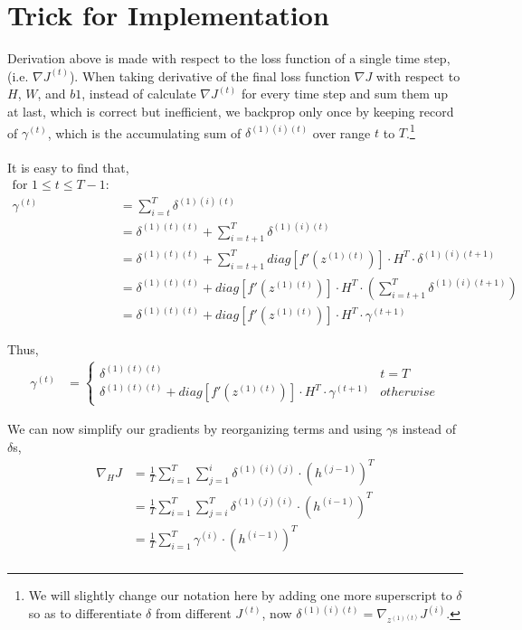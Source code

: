 \documentclass{article}
\begin{document}
	\section{Trick for Implementation}
	Derivation above is made with respect to the loss function of a single time step, (i.e. $\nabla J^{(t)}$). When taking derivative of the final loss function $\nabla J$ with respect to $H$, $W$, and $b1$, instead of calculate $\nabla J^{(t)}$ for every time step and sum them up at last, which is correct but inefficient, we backprop only once by keeping record of $\gamma^{(t)}$, which is the accumulating sum of $\delta^{(1)(i)(t)}$ over range $t$ to $T$.\footnote{We will slightly change our notation here by adding one more superscript to $\delta$ so as to differentiate $\delta$ from different $J^{(t)}$, now $\delta^{(1)(i)(t)} = \nabla_{z^{(1)(t)}}J^{(i)}$.} \\\\
	It is easy to find that,\\
	\begin{equation}
	\begin{aligned}
		\text{for $1 \le t \le T-1$:}\\
		\gamma^{(t)} &= \sum_{i=t}^{T} \delta^{(1)(i)(t)} \\
		&= \delta^{(1)(t)(t)} + \sum_{i=t+1}^{T} \delta^{(1)(i)(t)} \\
		&= \delta^{(1)(t)(t)} + \sum_{i=t+1}^{T} diag[f'(z^{(1)(t)})] \cdot H^T \cdot \delta^{(1)(i)(t+1)} \\
		&= \delta^{(1)(t)(t)} + diag[f'(z^{(1)(t)})] \cdot H^T \cdot \left(\sum_{i=t+1}^{T} \delta^{(1)(i)(t+1)}\right) \\		
		&= \delta^{(1)(t)(t)} + diag[f'(z^{(1)(t)})] \cdot H^T \cdot \gamma^{(t+1)} 
	\end{aligned}
	\end{equation}
	
	Thus,\\
	\begin{equation}
	\begin{aligned}
		\gamma^{(t)} &= 
		\begin{cases}
			\delta^{(1)(t)(t)} &t=T \\
			\delta^{(1)(t)(t)} + diag[f'(z^{(1)(t)})] \cdot H^T \cdot \gamma^{(t+1)} & otherwise
		\end{cases}
	\end{aligned}
	\end{equation}
	
	We can now simplify our gradients by reorganizing terms and using $\gamma$s instead of $\delta$s,
	\begin{equation}
	\begin{aligned}
		\nabla_{H} J 
		&= \frac{1}{T}\sum_{i=1}^{T} \sum_{j=1}^{i} \delta^{(1)(i)(j)} \cdot  (h^{(j-1)})^T\\
		&= \frac{1}{T} \sum_{i=1}^{T} \sum_{j=i}^{T} \delta^{(1)(j)(i)} \cdot  (h^{(i-1)})^T\\
		&= \frac{1}{T} \sum_{i=1}^{T} \gamma^{(i)} \cdot  (h^{(i-1)})^T\\
	\end{aligned}
	\end{equation}
	
\end{document}
